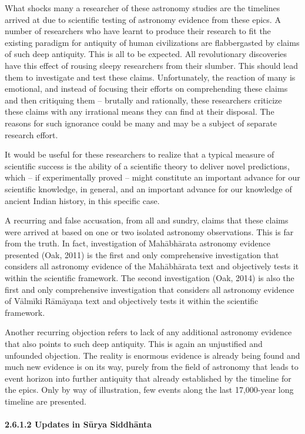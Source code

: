 What shocks many a researcher of these astronomy studies are the timelines arrived at due to scientific testing of astronomy evidence from these epics. A number of researchers who have learnt to produce their research to fit the existing paradigm for antiquity of human civilizations are flabbergasted by claims of such deep antiquity. This is all to be expected. All revolutionary discoveries have this effect of rousing sleepy researchers from their slumber. This should lead them to investigate and test these claims. Unfortunately, the reaction of many is emotional, and instead of focusing their efforts on comprehending these claims and then critiquing them – brutally and rationally, these researchers criticize these claims with any irrational means they can find at their disposal. The reasons for such ignorance could be many and may be a subject of separate research effort.

It would be useful for these researchers to realize that a typical measure of scientific success is the ability of a scientific theory to deliver novel predictions, which – if experimentally proved – might constitute an important advance for our scientific knowledge, in general, and an important advance for our knowledge of ancient Indian history, in this specific case.

A recurring and false accusation, from all and sundry, claims that these claims were arrived at based on one or two isolated astronomy observations. This is far from the truth. In fact, investigation of Mahābhārata astronomy evidence presented (Oak, 2011) is the first and only comprehensive investigation that considers all astronomy evidence of the Mahābhārata text and objectively tests it within the scientific framework. The second investigation (Oak, 2014) is also the first and only comprehensive investigation that considers all astronomy evidence of Vālmīki Rāmāyaņa text and objectively tests it within the scientific framework.

Another recurring objection refers to lack of any additional astronomy evidence that also points to such deep antiquity. This is again an unjustified and unfounded objection. The reality is enormous evidence is already being found and much new evidence is on its way, purely from the field of astronomy that leads to event horizon into further antiquity that already established by the timeline for the epics. Only by way of illustration, few events along the last 17,000-year long timeline are presented.


\paragraph*{2.6.1.2 Updates in Sūrya Siddhānta}

